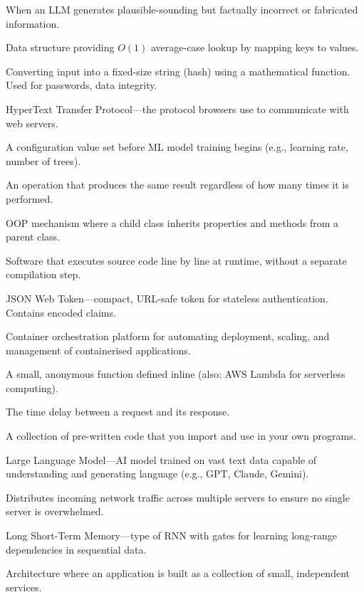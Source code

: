 \documentclass[12pt, a4paper, oneside]{book}
\begin{document}
\begin{description}[leftmargin=2em, style=nextline]
    \item[Hallucination] When an LLM generates plausible-sounding but factually incorrect or fabricated information.
    \item[Hash Map (Dictionary)] Data structure providing $O(1)$ average-case lookup by mapping keys to values.
    \item[Hashing] Converting input into a fixed-size string (hash) using a mathematical function. Used for passwords, data integrity.
    \item[HTTP] HyperText Transfer Protocol---the protocol browsers use to communicate with web servers.
    \item[Hyperparameter] A configuration value set before ML model training begins (e.g., learning rate, number of trees).
    \item[Idempotent] An operation that produces the same result regardless of how many times it is performed.
    \item[Inheritance] OOP mechanism where a child class inherits properties and methods from a parent class.
    \item[Interpreter] Software that executes source code line by line at runtime, without a separate compilation step.
    \item[JWT] JSON Web Token---compact, URL-safe token for stateless authentication. Contains encoded claims.
    \item[Kubernetes (K8s)] Container orchestration platform for automating deployment, scaling, and management of containerised applications.
    \item[Lambda Function] A small, anonymous function defined inline (also: AWS Lambda for serverless computing).
    \item[Latency] The time delay between a request and its response.
    \item[Library] A collection of pre-written code that you import and use in your own programs.
    \item[LLM] Large Language Model---AI model trained on vast text data capable of understanding and generating language (e.g., GPT, Claude, Gemini).
    \item[Load Balancer] Distributes incoming network traffic across multiple servers to ensure no single server is overwhelmed.
    \item[LSTM] Long Short-Term Memory---type of RNN with gates for learning long-range dependencies in sequential data.
    \item[Microservices] Architecture where an application is built as a collection of small, independent services.

\end{description}
\end{document}
